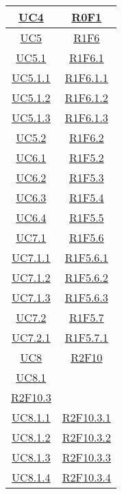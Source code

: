 \begin{longtable}{|c|c|}
	\hline
	\hyperlink{UC4}{UC4} & \hyperlink{R0F1}{R0F1}\\
	\hline
	\hyperlink{UC5}{UC5} & \hyperlink{R1F6}{R1F6}\\
	\hline
	\hyperlink{UC5.1}{UC5.1} & \hyperlink{R1F6.1}{R1F6.1}\\
	\hline
	\hyperlink{UC5.1.1}{UC5.1.1} & \hyperlink{R1F6.1.1}{R1F6.1.1}\\
	\hline
	\hyperlink{UC5.1.2}{UC5.1.2} & \hyperlink{R1F6.1.2}{R1F6.1.2}\\
	\hline
	\hyperlink{UC5.1.3}{UC5.1.3} & \hyperlink{R1F6.1.3}{R1F6.1.3}\\
	\hline
	\hyperlink{UC5.2}{UC5.2} & \hyperlink{R1F6.2}{R1F6.2}\\
	\hline
	\hyperlink{UC6.1}{UC6.1} & \hyperlink{R1F5.2}{R1F5.2}\\
	\hline
	\hyperlink{UC6.2}{UC6.2} & \hyperlink{R1F5.3}{R1F5.3}\\
	\hline
	\hyperlink{UC6.3}{UC6.3} & \hyperlink{R1F5.4}{R1F5.4}\\
	\hline
	\hyperlink{UC6.4}{UC6.4} & \hyperlink{R1F5.5}{R1F5.5}\\
	\hline
	\hyperlink{UC7.1}{UC7.1} & \hyperlink{R1F5.6}{R1F5.6}\\
	\hline
	\hyperlink{UC7.1.1}{UC7.1.1} & \hyperlink{R1F5.6.1}{R1F5.6.1}\\
	\hline
	\hyperlink{UC7.1.2}{UC7.1.2} & \hyperlink{R1F5.6.2}{R1F5.6.2}\\
	\hline
	\hyperlink{UC7.1.3}{UC7.1.3} & \hyperlink{R1F5.6.3}{R1F5.6.3}\\
	\hline
	\hyperlink{UC7.2}{UC7.2} & \hyperlink{R1F5.7}{R1F5.7}\\
	\hline
	\hyperlink{UC7.2.1}{UC7.2.1} & \hyperlink{R1F5.7.1}{R1F5.7.1}\\
	\hline
	\hyperlink{UC8}{UC8} & \hyperlink{R2F10}{R2F10}\\
	\hline
	\hyperlink{UC8.1}{UC8.1} &
	\begin{tabular}{c}
		\hyperlink{R2F10.1}{R2F10.1} \\ \hyperlink{R2F10.3}{R2F10.3}
	\end{tabular} \\
	\hline
	\hyperlink{UC8.1.1}{UC8.1.1} & \hyperlink{R2F10.3.1}{R2F10.3.1}\\
	\hline
	\hyperlink{UC8.1.2}{UC8.1.2} & \hyperlink{R2F10.3.2}{R2F10.3.2}\\
	\hline
	\hyperlink{UC8.1.3}{UC8.1.3} & \hyperlink{R2F10.3.3}{R2F10.3.3}\\
	\hline
	\hyperlink{UC8.1.4}{UC8.1.4} & \hyperlink{R2F10.3.4}{R2F10.3.4}\\

\end{longtable}
